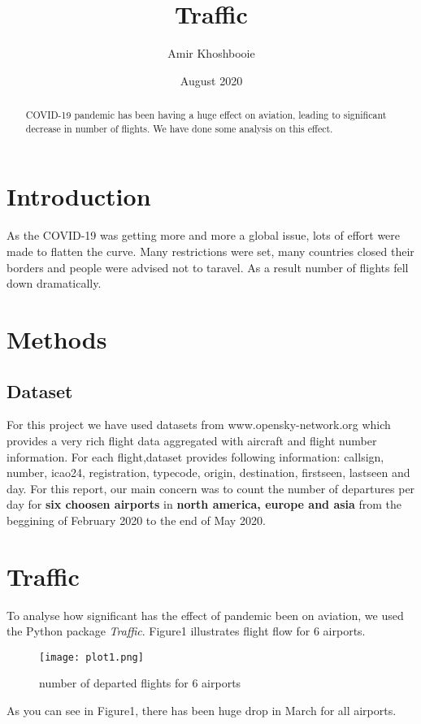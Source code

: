 \documentclass[12pt, a4paper]{article}
\title{Traffic}
\author{Amir Khoshbooie}
\date{August 2020}
\begin{document}
\begin{abstract}
COVID-19 pandemic has been having a huge effect on aviation, leading to significant decrease in number of flights. We have done some analysis on this effect.
\end{abstract}
\maketitle

\section{Introduction}
As the COVID-19 was getting more and more a global issue, lots of effort were made to flatten the curve. Many restrictions were set, many countries closed their borders and people were advised not to taravel. As a result number of flights fell down dramatically.


\section{Methods}

\subsection{Dataset}

For this project we have used datasets from www.opensky-network.org  which provides a very rich flight data aggregated with aircraft and flight number information. For each flight,dataset provides following information: callsign, number, icao24, registration, typecode, origin, destination, firstseen, lastseen and day. For this report, our main concern was to count the number of departures per day for \textbf{six choosen airports} in \textbf{north america, europe and asia} from the beggining of February 2020 to the end of May 2020.

\section{Traffic}
To analyse how significant has the effect of pandemic been on aviation, we used the Python package \emph{Traffic}.
Figure1 illustrates flight flow for 6 airports.
\newpage
\vfill
\begin{figure}[h]
    \centering
    \texttt{[image: plot1.png]}
    \caption{number of departed flights for 6 airports}
    \label{fig:mesh1}
\end{figure}
\vfill
\clearpage
As you can see in Figure1, there has been huge drop in March for all airports.
\end{document}
